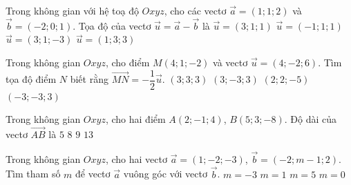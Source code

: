 \begin{ex}%
Trong không gian với hệ toạ độ $Oxyz$, cho các vectơ $\overrightarrow{a}=(1;1;2)$ và $\overrightarrow{b}=(-2;0;1)$. Tọa độ của vectơ $\overrightarrow{u}=\overrightarrow{a}-\overrightarrow{b}$ là
\choice
{\True $\overrightarrow{u}=(3;1;1)$}
{$\overrightarrow{u}=(-1;1;1)$}
{$\overrightarrow{u}=(3;1;-3)$}
{$\overrightarrow{u}=(1;3;3)$}
\end{ex}

\begin{ex}%
Trong không gian $Oxyz$, cho điểm $M(4;1;-2)$ và vectơ $\overrightarrow{u}=(4;-2;6)$. Tìm tọa độ điểm $N$ biết rằng $\overrightarrow{MN}=-\dfrac{1}{2}\overrightarrow{u}$.
\choice
{$(3;3;3)$}
{$(3;-3;3)$}
{\True $(2;2;-5)$}
{$(-3;-3;3)$}
\end{ex}

\begin{ex}%
Trong không gian $Oxyz$, cho hai điểm $A(2;-1;4)$, $B(5;3;-8)$. Độ dài của vectơ $\overrightarrow{AB}$ là
\choice
{$5$}
{$8$}
{$9$}
{\True $13$}
\end{ex}

\begin{ex}%
Trong không gian $Oxyz$, cho hai vectơ $\overrightarrow{a}=(1;-2;-3)$, $\overrightarrow{b}=(-2;m-1;2)$. Tìm tham số $m$ để vectơ $\overrightarrow{a}$ vuông góc với vectơ $\overrightarrow{b}$.
\choice
{\True $m=-3$}
{$m=1$}
{$m=5$}
{$m=0$}
\end{ex}

